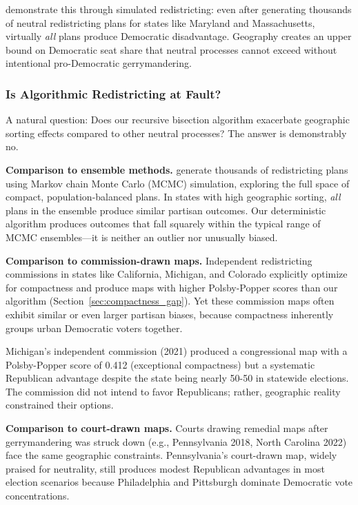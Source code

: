 \citet{chen2017impact} demonstrate this through simulated redistricting: even after generating thousands of neutral redistricting plans for states like Maryland and Massachusetts, virtually \textit{all} plans produce Democratic disadvantage. Geography creates an upper bound on Democratic seat share that neutral processes cannot exceed without intentional pro-Democratic gerrymandering.

\subsubsection{Is Algorithmic Redistricting at Fault?}

A natural question: Does our recursive bisection algorithm exacerbate geographic sorting effects compared to other neutral processes? The answer is demonstrably no.

\textbf{Comparison to ensemble methods.} \citet{deford2019} generate thousands of redistricting plans using Markov chain Monte Carlo (MCMC) simulation, exploring the full space of compact, population-balanced plans. In states with high geographic sorting, \textit{all} plans in the ensemble produce similar partisan outcomes. Our deterministic algorithm produces outcomes that fall squarely within the typical range of MCMC ensembles---it is neither an outlier nor unusually biased.

\textbf{Comparison to commission-drawn maps.} Independent redistricting commissions in states like California, Michigan, and Colorado explicitly optimize for compactness and produce maps with higher Polsby-Popper scores than our algorithm (Section~\ref{sec:compactness_gap}). Yet these commission maps often exhibit similar or even larger partisan biases, because compactness inherently groups urban Democratic voters together.

Michigan's independent commission (2021) produced a congressional map with a Polsby-Popper score of 0.412 (exceptional compactness) but a systematic Republican advantage despite the state being nearly 50-50 in statewide elections. The commission did not intend to favor Republicans; rather, geographic reality constrained their options.

\textbf{Comparison to court-drawn maps.} Courts drawing remedial maps after gerrymandering was struck down (e.g., Pennsylvania 2018, North Carolina 2022) face the same geographic constraints. Pennsylvania's court-drawn map, widely praised for neutrality, still produces modest Republican advantages in most election scenarios because Philadelphia and Pittsburgh dominate Democratic vote concentrations.

